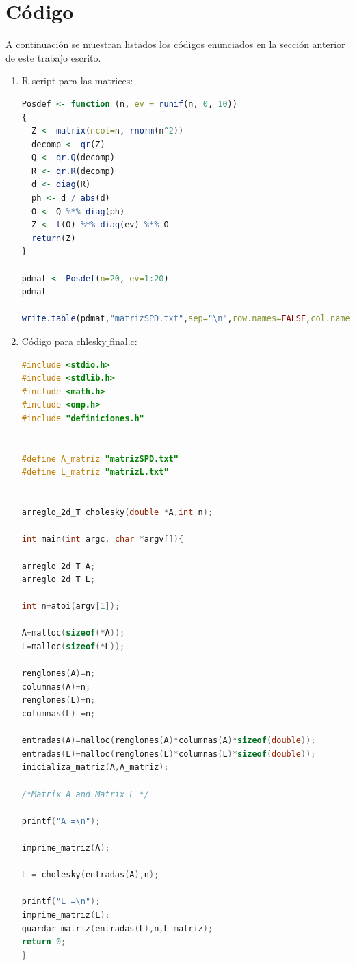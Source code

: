 \documentclass[10pt, oneside,spanish]{article}
\begin{document}
\section{Código}

A continuación se muestran listados los códigos enunciados en la sección anterior de este trabajo escrito.

\begin{enumerate}
\item R script para las matrices:
	

\begin{lstlisting}[language=R]
Posdef <- function (n, ev = runif(n, 0, 10)) 
{
  Z <- matrix(ncol=n, rnorm(n^2))
  decomp <- qr(Z)
  Q <- qr.Q(decomp) 
  R <- qr.R(decomp)
  d <- diag(R)
  ph <- d / abs(d)
  O <- Q %*% diag(ph)
  Z <- t(O) %*% diag(ev) %*% O
  return(Z)
}

pdmat <- Posdef(n=20, ev=1:20)
pdmat

write.table(pdmat,"matrizSPD.txt",sep="\n",row.names=FALSE,col.names =  FALSE, dec = '.')
\end{lstlisting}

\item Código para chlesky$\_$final.c:

\begin{lstlisting}[language=C]
#include <stdio.h>
#include <stdlib.h>
#include <math.h>
#include <omp.h>
#include "definiciones.h"


#define A_matriz "matrizSPD.txt" 
#define L_matriz "matrizL.txt"


arreglo_2d_T cholesky(double *A,int n);

int main(int argc, char *argv[]){

arreglo_2d_T A;
arreglo_2d_T L;

int n=atoi(argv[1]); 

A=malloc(sizeof(*A));
L=malloc(sizeof(*L));

renglones(A)=n;
columnas(A)=n;
renglones(L)=n;
columnas(L) =n;

entradas(A)=malloc(renglones(A)*columnas(A)*sizeof(double));
entradas(L)=malloc(renglones(L)*columnas(L)*sizeof(double));
inicializa_matriz(A,A_matriz);

/*Matrix A and Matrix L */

printf("A =\n");

imprime_matriz(A);

L = cholesky(entradas(A),n);

printf("L =\n");
imprime_matriz(L);
guardar_matriz(entradas(L),n,L_matriz);
return 0;
}




\end{lstlisting}
\end{enumerate}
\end{document}

